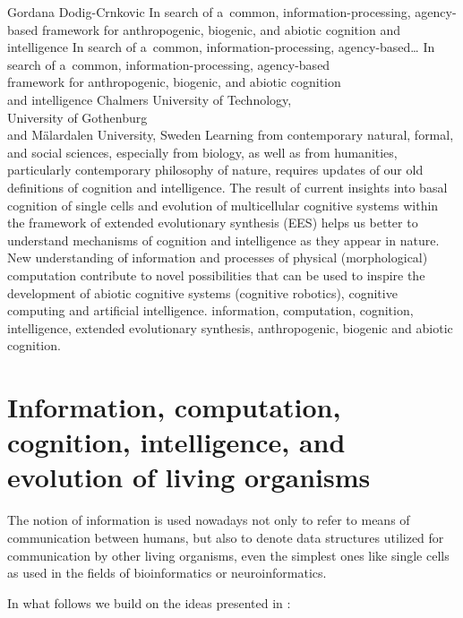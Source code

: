\begin{artengenv}{Gordana Dodig-Crnkovic}
	{\label{gordana_start}In search of a~common, information-processing, agency-based framework for anthropogenic, biogenic, and abiotic cognition and intelligence}
	{In search of a~common, information-processing, agency-based\ldots}
	{In search of a~common, information-processing, agency-based\\framework for anthropogenic, biogenic, and abiotic cognition\\and intelligence}
	{Chalmers University of Technology,\\University of Gothenburg\\and Mälardalen University, Sweden}
	{Learning from contemporary natural, formal, and social sciences, especially from
	biology, as well as from humanities, particularly contemporary philosophy of nature, requires updates of our old definitions of cognition and intelligence. The result of current insights into basal cognition of single cells and evolution of multicellular cognitive systems within the framework of extended evolutionary synthesis (EES) helps us better to understand mechanisms of cognition and intelligence as they appear in nature. New understanding of information and processes of physical (morphological) computation contribute to novel possibilities that can be used to inspire the development of abiotic cognitive systems (cognitive robotics), cognitive computing and artificial intelligence.
	}
	{information, computation, cognition, intelligence, extended evolutionary synthesis, anthropogenic, biogenic and abiotic cognition.}


\section*{Information, computation, cognition, intelligence, and evolution of living organisms}
\lettrine[loversize=0.13,lines=2,lraise=-0.03,nindent=0em,findent=0.2pt]%
{T}{}he notion of information is used nowadays not only to refer to means of communication between humans, but also to denote data structures utilized for communication by other living organisms, even the simplest ones like single cells as used in the fields of bioinformatics or neuroinformatics.

In what follows we build on the ideas presented in
\parencite[][]{dodig-crnkovic_computational_2017}:%


\end{artengenv}

